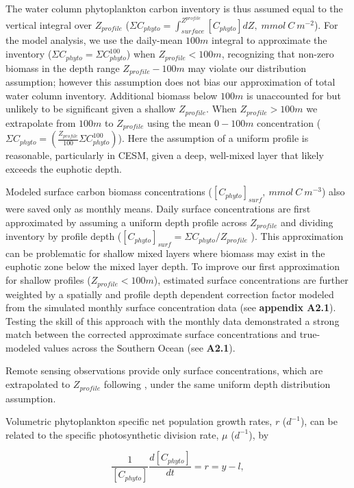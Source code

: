 The water column phytoplankton carbon inventory is thus assumed equal to the vertical integral over $Z_{profile}$ ($\Sigma C_{phyto} = \int^{Z^{profile}}_{surface} [C_{phyto}] dZ, \; mmol \: C \: m^{-2}$). For the model analysis, we use the daily-mean $100m$ integral to approximate the inventory ($\Sigma C_{phyto} = \Sigma C^{100}_{phyto}$) when $Z_{profile} < 100m$, recognizing that non-zero biomass in the depth range $Z_{profile}-100m$ may violate our distribution assumption; however this assumption does not bias our approximation of total water column inventory. Additional biomass below $100m$ is unaccounted for but unlikely to be significant given a shallow $Z_{profile}$. When $Z_{profile} > 100m$ we extrapolate from $100m$ to $Z_{profile}$ using the mean $0-100m$ concentration ($\Sigma C_{phyto} = (\frac{Z_{profile}}{100}\Sigma C^{100}_{phyto})$). Here the assumption of a uniform profile is reasonable, particularly in CESM, given a deep, well-mixed layer that likely exceeds the euphotic depth.  

Modeled surface carbon biomass concentrations ($[C_{phyto}]_{surf}, \: mmol \: C \: m^{-3}$) also were saved only as monthly means. Daily surface concentrations are first approximated by assuming a uniform depth profile across $Z_{profile}$ and dividing inventory by profile depth ($[C_{phyto}]_{surf} = \Sigma C_{phyto}/Z_{profile}$ ). This approximation can be problematic for shallow mixed layers where biomass may exist in the euphotic zone below the mixed layer depth. To improve our first approximation for shallow profiles ($Z_{profile}<100m$), estimated surface concentrations are further weighted by a spatially and profile depth dependent correction factor modeled from the simulated monthly surface concentration data (see \textbf{appendix A2.1}). Testing the skill of this approach with the monthly data demonstrated a strong match between the corrected approximate surface concentrations and true-modeled values across the Southern Ocean (see \textbf{A2.1}).

Remote sensing observations provide only surface concentrations, which are extrapolated to $Z_{profile}$ following \parencite{BehrenfeldAnnualcyclesecological2013}, under the same uniform depth distribution assumption.

Volumetric phytoplankton specific net population growth rates, $r$ ($d^{-1}$), can be related to the specific photosynthetic division rate, $\mu$ ($d^{-1}$), by 

\begin{equation}
    \frac{1}{[C_{phyto}]} \frac{d[C_{phyto}]}{dt} = r=y-l,
\end{equation}

